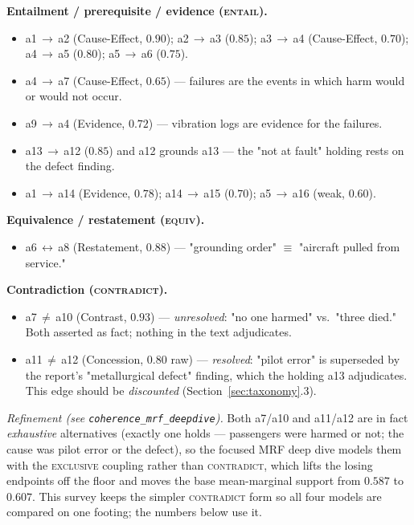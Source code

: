 \documentclass[11pt]{article}
\begin{document}
\noindent\textbf{Entailment / prerequisite / evidence (\textsc{entail}).}
\begin{itemize}[leftmargin=*,nosep]
  \item a1\,$\to$\,a2 (Cause-Effect, $0.90$); a2\,$\to$\,a3 ($0.85$); a3\,$\to$\,a4
        (Cause-Effect, $0.70$); a4\,$\to$\,a5 ($0.80$); a5\,$\to$\,a6 ($0.75$).
  \item a4\,$\to$\,a7 (Cause-Effect, $0.65$) --- failures are the events in which harm
        would or would not occur.
  \item a9\,$\to$\,a4 (Evidence, $0.72$) --- vibration logs are evidence for the failures.
  \item a13\,$\to$\,a12 ($0.85$) and a12 grounds a13 --- the "not at fault" holding rests
        on the defect finding.
  \item a1\,$\to$\,a14 (Evidence, $0.78$); a14\,$\to$\,a15 ($0.70$); a5\,$\to$\,a16
        (weak, $0.60$).
\end{itemize}

\noindent\textbf{Equivalence / restatement (\textsc{equiv}).}
\begin{itemize}[leftmargin=*,nosep]
  \item a6\,$\leftrightarrow$\,a8 (Restatement, $0.88$) --- "grounding order" $\equiv$
        "aircraft pulled from service."
\end{itemize}

\noindent\textbf{Contradiction (\textsc{contradict}).}
\begin{itemize}[leftmargin=*,nosep]
  \item a7\,$\neq$\,a10 (Contrast, $0.93$) --- \emph{unresolved}: "no one harmed" vs.\
        "three died." Both asserted as fact; nothing in the text adjudicates.
  \item a11\,$\neq$\,a12 (Concession, $0.80$ raw) --- \emph{resolved}: "pilot error" is
        superseded by the report's "metallurgical defect" finding, which the holding a13
        adjudicates. This edge should be \emph{discounted} (Section~\ref{sec:taxonomy}.3).
\end{itemize}

\noindent\emph{Refinement (see \texttt{coherence\_mrf\_deepdive}).} Both a7/a10 and a11/a12 are
in fact \emph{exhaustive} alternatives (exactly one holds --- passengers were harmed or not; the
cause was pilot error or the defect), so the focused MRF deep dive models them with the
\textsc{exclusive} coupling rather than \textsc{contradict}, which lifts the losing endpoints off
the floor and moves the base mean-marginal support from $0.587$ to $0.607$. This survey keeps the
simpler \textsc{contradict} form so all four models are compared on one footing; the numbers below
use it.
\end{document}

